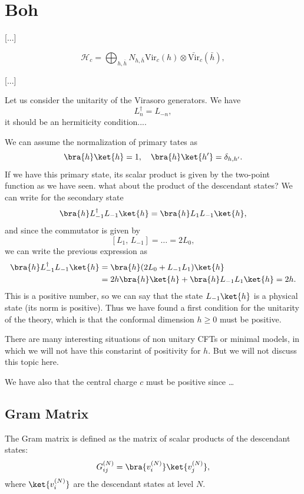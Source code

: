 \section{Boh}

 [...]

\[
    \mathcal{H}_c = \bigoplus_{h, \bar{h}} N_{h, \bar{h}} \mathrm{Vir}_c(h) \otimes \bar{\mathrm{Vir}}_{c}(\bar{h}),
\]

[...]

Let us consider the unitarity of the Virasoro generators. We have
\[
    L_n^\dagger = L_{-n},
\]
it should be an hermiticity condition....

We can assume the normalization of primary tates as
\[
    \bra{h}\ket{h} = 1, \quad \bra{h}\ket{h^{\prime}} = \delta_{h,h^{\prime}}.
\]
If we have this primary state, its scalar product is given by the two-point function as we have seen. what about the product of the descendant states? We can write for the secondary state
\[
    \bra{h} L_{-1}^\dagger L_{-1} \ket{h} = \bra{h} L_1 L_{-1} \ket{h},
\]
and since the commutator is given by
\[
    [L_1,\,L_{-1}] = \dots = 2 L_0,
\]
we can write the previous expression as
\[
    \begin{aligned}
        \bra{h} L_{-1}^\dagger L_{-1} \ket{h} & = \bra{h} (2 L_0 + L_{-1} L_1) \ket{h}                   \\
                                              & = 2 h \bra{h}\ket{h} + \bra{h} L_{-1} L_1 \ket{h} = 2 h.
    \end{aligned}
\]
This is a positive number, so we can say that the state $L_{-1} \ket{h}$ is a physical state (its norm is positive). Thus we have found a first condition for the unitarity of the theory, which is that the conformal dimension \(h \geq 0\) must be positive.

There are many interesting situations of non unitary CFTs or minimal models, in which we will not have this constarint of positivity for \(h\). But we will not discuss this topic here.

We have also that the central charge \(c\) must be positive since \dots

\subsection{Gram Matrix}

The Gram matrix is defined as the matrix of scalar products of the descendant states:
\[
    G_{ij}^{(N)} = \bra{v_i^{(N)}}\ket{v_j^{(N)}},
\]
where \(\ket{v_i^{(N)}}\) are the descendant states at level \(N\).

